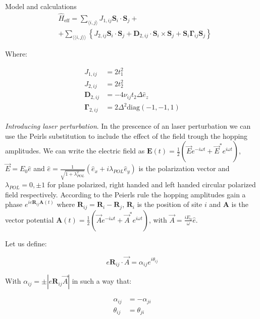 \documentclass[aps,prl,twocolumn,amsmath,amssymb,superscriptaddress,nobibnotes]{revtex4}%
\newcommand{\n}{\nonumber}
\newcommand{\bs}{\boldsymbol}
\begin{document}
\begin{section}{Model and calculations}
\begin{align}
\label{MKMHeff0}
&\hat{H}_{\text{eff}} = \sum_{\langle i,j \rangle} J_{1,ij}\bs{S}_i\cdot\bs{S}_j +\n \\
&+ \sum_{\langle \langle i,j \rangle \rangle} \left\{ J_{2,ij}\bs{S}_i\cdot\bs{S}_j + \bs{D}_{2,ij}\cdot \bs{S}_i \times \bs{S}_j + \bs{S}_i \bs{\Gamma}_{ij} \bs{S}_j \right\}
\end{align}

Where:

\begin{align*}
J_{1,ij} &= 2t_1^2 \\
J_{2,ij} &= 2t_2^2 \\
\bs{D}_{2,ij} &= - 4\nu_{ij} t_2 \Delta \hat{e}_z \\
\bs{\Gamma}_{2,ij} &= 2\Delta^2 \text{diag}(-1,-1,1)
\end{align*}

\textit{Introducing laser perturbation}. In the prescence of an laser perturbation we can use the Peirls substitution to include the effect of the field trough the hopping amplitudes. We can write the electric field as $\bs{E}(t) = \frac{1}{2}(\vec{E}e^{-i\omega t}+\vec{E}^*e^{i\omega t})$, $\vec{E} = E_0\hat{e}$ and $\hat{e} = \frac{1}{\sqrt{1+\lambda_{POL}^2}}(\hat{e}_x+i\lambda_{POL}\hat{e}_y)$ is the polarization vector and $\lambda_{POL} = 0, \pm 1$ for plane polarized, right handed and left handed circular polarized field respectively. According to the Peierls rule the hopping amplitudes gain a phase $e^{ie\bs{R}_{ij}\bs{A}(t)}$ where $\bs{R}_{ij} = \bs{R}_i-\bs{R}_j$, $\bs{R}_i$ is the position of site $i$ and $\bs{A}$ is the vector potential $\bs{A}(t) = \frac{1}{2}(\vec{A}e^{-i\omega t} + \vec{A}^* e^{i\omega t})$, with $\vec{A} = \frac{iE_0}{\omega}\hat{e}$.

Let us define:

\begin{equation}
\label{Def_alpha}
e\bs{R}_{ij}\cdot\vec{A} = \alpha_{ij} e^{i \theta_{ij}}
\end{equation}

With $\alpha_{ij} = \pm|e\bs{R}_{ij}\vec{A}|$ in such a way that:

\begin{align}
\alpha_{ij} &= -\alpha_{ji} \label{alphaSym} \\
\theta_{ij} &= \theta_{ji} \label{thetaSym}
\end{align}


\end{section}
\end{document}
